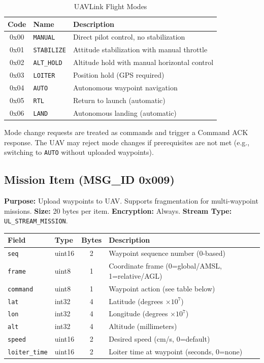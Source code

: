 \documentclass[11pt,a4paper]{article}
\begin{document}
\begin{table}[H]
\centering
\begin{tabular}{@{}clp{8cm}@{}}
\toprule
\textbf{Code} & \textbf{Name} & \textbf{Description} \\
\midrule
0x00 & \texttt{MANUAL}    & Direct pilot control, no stabilization \\
0x01 & \texttt{STABILIZE} & Attitude stabilization with manual throttle \\
0x02 & \texttt{ALT\_HOLD}  & Altitude hold with manual horizontal control \\
0x03 & \texttt{LOITER}    & Position hold (GPS required) \\
0x04 & \texttt{AUTO}      & Autonomous waypoint navigation \\
0x05 & \texttt{RTL}       & Return to launch (automatic) \\
0x06 & \texttt{LAND}      & Autonomous landing (automatic) \\
\bottomrule
\end{tabular}
\caption{UAVLink Flight Modes}
\end{table}

\begin{notebox}
Mode change requests are treated as commands and trigger a Command ACK response. The UAV may reject mode changes if prerequisites are not met (e.g., switching to \texttt{AUTO} without uploaded waypoints).
\end{notebox}

\subsection{Mission Item (MSG\_ID 0x009)}

\textbf{Purpose:} Upload waypoints to UAV. Supports fragmentation for multi-waypoint missions. \textbf{Size:} 20 bytes per item. \textbf{Encryption:} Always. \textbf{Stream Type:} \texttt{UL\_STREAM\_MISSION}.

\begin{table}[H]
\centering
\begin{tabular}{@{}llcl@{}}
\toprule
\textbf{Field} & \textbf{Type} & \textbf{Bytes} & \textbf{Description} \\
\midrule
\texttt{seq}          & uint16 & 2 & Waypoint sequence number (0-based) \\
\texttt{frame}        & uint8  & 1 & Coordinate frame (0=global/AMSL, 1=relative/AGL) \\
\texttt{command}      & uint8  & 1 & Waypoint action (see table below) \\
\texttt{lat}          & int32  & 4 & Latitude (degrees $\times 10^7$) \\
\texttt{lon}          & int32  & 4 & Longitude (degrees $\times 10^7$) \\
\texttt{alt}          & int32  & 4 & Altitude (millimeters) \\
\texttt{speed}        & uint16 & 2 & Desired speed (cm/s, 0=default) \\
\texttt{loiter\_time} & uint16 & 2 & Loiter time at waypoint (seconds, 0=none) \\
\bottomrule
\end{tabular}
\end{table}
\end{document}

